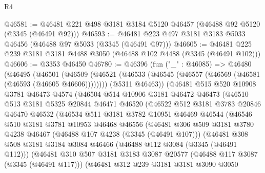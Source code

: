 \begin{lexlean}{R4}
\begin{coremodule}
@46581 := @46481 @221 @498 @3181 @3184 @5120 @46457 (@46488 @92 @5120 (@3345 (@46491 @92)))
@46593 := @46481 @223 @497 @3181 @3183 @5033 @46456 (@46488 @97 @5033 (@3345 (@46491 @97)))
@46605 := @46481 @225 @239 @3181 @3181 @4488 @3050 (@46488 @102 @4488 (@3345 (@46491 @102)))
@46606 := @3353 @46450
@46780 := @46396
    (fun ("_" : @46085) =>
    @46480
      (@46495
        (@46501
          (@46509
            (@46521 (@46533 (@46545 (@46557 (@46569 (@46581 (@46593 (@46605 @46606))))))))
            (@5311 @46463))
          (@46481
            @515
            @520
            @10908
            @3781
            @46473
            @4574
            (@46504
              @514
              @10906
              @3181
              @46472
              @46473
              (@46510
                @513
                @3181
                @5325
                @20844
                @46471
                @46520
                (@46522
                  @512
                  @3181
                  @3783
                  @20846
                  @46470
                  @46532
                  (@46534
                    @511
                    @3181
                    @3782
                    @10951
                    @46469
                    @46544
                    (@46546
                      @510
                      @3181
                      @3781
                      @10953
                      @46468
                      @46556
                      (@46481
                        @306
                        @509
                        @3181
                        @3780
                        @4238
                        @46467
                        (@46488 @107 @4238 (@3345 (@46491 @107)))
                        (@46481
                          @308
                          @508
                          @3181
                          @3184
                          @3084
                          @46466
                          (@46488 @112 @3084 (@3345 (@46491 @112)))
                          (@46481
                            @310
                            @507
                            @3181
                            @3183
                            @3087
                            @20577
                            (@46488 @117 @3087 (@3345 (@46491 @117)))
                            (@46481
                              @312
                              @239
                              @3181
                              @3181
                              @3090
                              @3050

\end{coremodule}
\end{lexlean}
